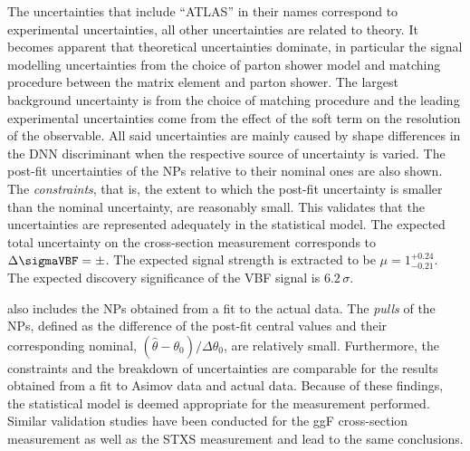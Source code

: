 The uncertainties that include ``ATLAS'' in their names correspond to experimental uncertainties, all other uncertainties are related to theory. 
It becomes apparent that theoretical uncertainties dominate, in particular the signal modelling uncertainties from the choice of parton shower model and matching procedure between the matrix element and parton shower. 
The largest background uncertainty is from the choice of \ttbar matching procedure and the leading experimental uncertainties come from the effect of the \MET soft term on the resolution of the \MET observable.  
All said uncertainties are mainly caused by shape differences in the DNN discriminant when the respective source of uncertainty is varied.
The post-fit uncertainties of the NPs relative to their nominal ones are also shown. The \emph{constraints}, that is, the extent to which the post-fit uncertainty is smaller than the nominal uncertainty, are reasonably small.
This validates that the uncertainties are represented adequately in the statistical model. 
The expected total uncertainty on the cross-section measurement corresponds to $\Delta \sigmaVBF = \pm  $. 
The expected signal strength is extracted to be $\mu = 1^{+0.24}_{-0.21}$.
The expected discovery significance of the VBF signal is $6.2\,\sigma$. 

 also includes the NPs obtained from a fit to the actual data. 
The \emph{pulls} of the NPs, defined as the difference of the post-fit central values and their corresponding nominal, $(\hat{\theta} - \theta_0 ) / \Delta \theta_0$, are relatively small. 
Furthermore, the constraints and the breakdown of uncertainties are comparable for the results obtained from a fit to Asimov data and actual data. 
Because of these findings, the statistical model is deemed appropriate for the measurement performed. 
Similar validation studies have been conducted for the ggF cross-section measurement as well as the STXS measurement and lead to the same conclusions. 



